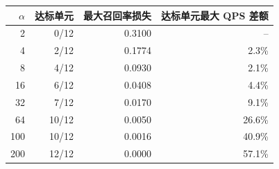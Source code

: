 \begin{tabular}{@{}rrrr@{}}
\toprule
$\alpha$ & 达标单元 & 最大召回率损失 & 达标单元最大 QPS 差额 \\
\midrule
2 & 0/12 & 0.3100 & -- \\
4 & 2/12 & 0.1774 & 2.3\% \\
8 & 4/12 & 0.0930 & 2.1\% \\
16 & 6/12 & 0.0408 & 4.4\% \\
32 & 7/12 & 0.0170 & 9.1\% \\
64 & 10/12 & 0.0050 & 26.6\% \\
100 & 10/12 & 0.0016 & 40.9\% \\
200 & 12/12 & 0.0000 & 57.1\% \\
\bottomrule
\end{tabular}
